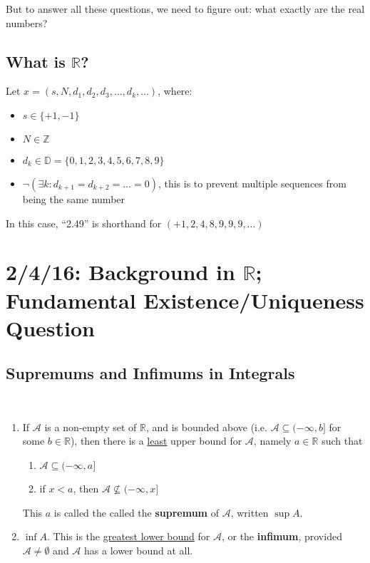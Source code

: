 \documentclass[12pt]{article}
\begin{document}
But to answer all these questions, we need to figure out: what exactly are the real numbers? 

\subsection{What is $\mathbb{R}$?}
Let $x = (s,N,d_1,d_2,d_3,\dots,d_k,\dots)$, where:
\begin{itemize}
\item $s \in \{+1,-1\}$
\item $N \in \mathbb{Z}$
\item $d_k \in \mathbb{D} = \{0,1,2,3,4,5,6,7,8,9\}$
\item $\neg (\exists k : d_{k+1} = d_{k+2} = \dots = 0)$, this is to prevent multiple sequences from being the same number
\end{itemize}

In this case, ``2.49'' is shorthand for $(+1,2,4,8,9,9,9,\dots)$

\section{2/4/16: Background in $\mathbb{R}$; Fundamental Existence/Uniqueness Question}

\subsection{Supremums and Infimums in Integrals}
\begin{theorem} 
\
\begin{enumerate}
\item If $\mathcal{A}$ is a non-empty set of $\mathbb{R}$, and is bounded above (i.e. $\mathcal{A} \subseteq (-\infty, b]$ for some $b \in \mathbb{R}$), then there is a \underline{least} upper bound for $\mathcal{A}$, namely $a \in \mathbb{R}$ such that
\begin{enumerate}
\item $\mathcal{A} \subseteq (-\infty, a]$
\item if $x < a$, then $\mathcal{A} \not \subseteq (-\infty, x]$
\end{enumerate}
This $a$ is called the called the \textbf{supremum} of $\mathcal{A}$, written $\sup{A}$.
\item $\inf{A}$. This is the \underline{greatest lower bound} for $\mathcal{A}$, or the \textbf{infimum}, provided $\mathcal{A} \neq \emptyset$ and $\mathcal{A}$ has a lower bound at all.
\end{enumerate}
\end{theorem}
\end{document}
